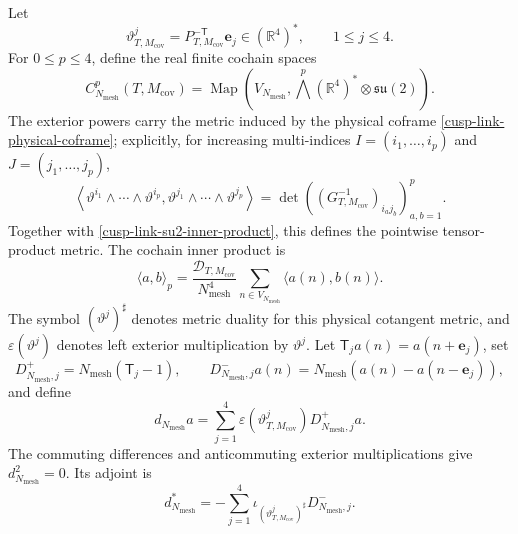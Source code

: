 \documentclass[11pt]{article}
\theoremstyle{definition}
\numberwithin{equation}{section}
\begin{document}
Let
\begin{equation}
 \vartheta^j_{T,M_{\mathrm{cov}}}
 =P_{T,M_{\mathrm{cov}}}^{-\mathsf T}\mathbf e_j
 \in(\mathbb R^4)^*,
 \qquad 1\leq j\leq4.
 \label{cusp-link-physical-coframe}
\end{equation}
For \(0\leq p\leq4\), define the real finite cochain spaces
\begin{equation}
 C^p_{N_{\mathrm{mesh}}}(T,M_{\mathrm{cov}})
 =\operatorname{Map}\left(
 V_{N_{\mathrm{mesh}}},
 \bigwedge^p(\mathbb R^4)^*\otimes\mathfrak{su}(2)
 \right).
 \label{cusp-link-cochain-spaces}
\end{equation}
The exterior powers carry the metric induced by the physical coframe
\eqref{cusp-link-physical-coframe}; explicitly, for increasing multi-indices
\(I=(i_1,\ldots,i_p)\) and \(J=(j_1,\ldots,j_p)\),
\begin{equation}
 \left\langle
  \vartheta^{i_1}\wedge\cdots\wedge\vartheta^{i_p},
  \vartheta^{j_1}\wedge\cdots\wedge\vartheta^{j_p}
 \right\rangle
 =
 \det\left((G_{T,M_{\mathrm{cov}}}^{-1})_{i_a j_b}\right)_{a,b=1}^p.
 \label{cusp-link-exterior-metric}
\end{equation}
Together with \eqref{cusp-link-su2-inner-product}, this defines the
pointwise tensor-product metric.  The cochain inner product is
\begin{equation}
 \langle a,b\rangle_p
 =\frac{\mathcal D_{T,M_{\mathrm{cov}}}}{N_{\mathrm{mesh}}^4}
   \sum_{n\in V_{N_{\mathrm{mesh}}}}
   \langle a(n),b(n)\rangle.
 \label{cusp-link-cochain-inner-product}
\end{equation}
The symbol \((\vartheta^j)^\sharp\) denotes metric duality for this physical
cotangent metric, and \(\varepsilon(\vartheta^j)\) denotes left exterior
multiplication by \(\vartheta^j\).  Let
\(\mathsf T_j a(n)=a(n+\mathbf e_j)\), set
\begin{equation}
 D^+_{N_{\mathrm{mesh}},j}
 =N_{\mathrm{mesh}}(\mathsf T_j-1),
 \qquad
 D^-_{N_{\mathrm{mesh}},j}a(n)
 =N_{\mathrm{mesh}}(a(n)-a(n-\mathbf e_j)),
 \label{cusp-link-differences}
\end{equation}
and define
\begin{equation}
 d_{N_{\mathrm{mesh}}}a
 =\sum_{j=1}^4
  \varepsilon(\vartheta^j_{T,M_{\mathrm{cov}}})
  D^+_{N_{\mathrm{mesh}},j}a.
 \label{cusp-link-finite-exterior-derivative}
\end{equation}
The commuting differences and anticommuting exterior multiplications give
\(d_{N_{\mathrm{mesh}}}^2=0\).  Its adjoint is
\begin{equation}
 d_{N_{\mathrm{mesh}}}^*
 =-\sum_{j=1}^4
  \iota_{(\vartheta^j_{T,M_{\mathrm{cov}}})^\sharp}
  D^-_{N_{\mathrm{mesh}},j}.
 \label{cusp-link-finite-adjoint}
\end{equation}
\end{document}
